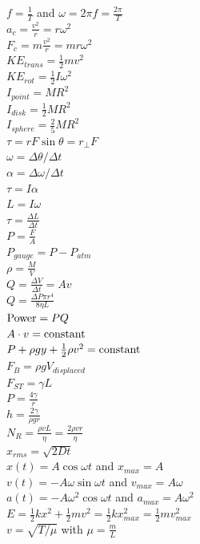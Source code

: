 \documentclass[letterpaper,addpoints,answers]{exam}
\begin{document}
\begin{multicols}{2}
 $f = \frac{1}{T}$ and $\omega = 2 \pi f = \frac{2 \pi}{T}$ \\
 $a_c = \frac{v^2}{r} = r \omega^2$ \\
 $F_c = m\frac{v^2}{r} = m r \omega^2$ \\
 $KE_{trans} = \frac{1}{2} m v^2$ \\
 $KE_{rot} = \frac{1}{2} I \omega^2$ \\
 $I_{point} = M R^2$ \\
 $I_{disk} = \frac{1}{2} M R^2$ \\
 $I_{sphere} = \frac{2}{5} M R^2$ \\
 $\tau = r F \sin\theta = r_\perp F$ \\
 $\omega = \Delta \theta/\Delta t$ \\
 $\alpha = \Delta \omega/\Delta t$ \\
 $\tau = I \alpha$ \\
 $L = I \omega$ \\
 $\tau = \frac{\Delta L}{\Delta t}$ \\
 $P = \frac{F}{A}$ \\
 $P_{gauge} = P - P_{atm}$ \\
 $\rho = \frac{M}{V}$ \\
 $Q = \frac{\Delta V}{\Delta t} = A v$ \\
 $Q = \frac{\Delta P \pi r^4}{8 \eta L}$ \\
 $\hbox{Power} = P Q$ \\
 $A \cdot v = \hbox{constant}$ \\
 $P + \rho g y + \frac{1}{2} \rho v^2 = \hbox{constant}$ \\
 $F_B = \rho g V_{displaced}$ \\
 $F_{ST} = \gamma L$ \\
 $P = \frac{4 \gamma}{r}$ \\
 $h = \frac{2 \gamma}{\rho g r}$ \\
 $N_R = \frac{\rho v L}{\eta} = \frac{2 \rho v r}{\eta}$ \\
 $x_{rms} = \sqrt{2 D t}$ \\
 $x(t) = A \cos \omega t$ and $x_{max} = A$ \\
 $v(t) = - A \omega \sin \omega t$ and $v_{max} = A \omega$ \\
 $a(t) = - A \omega^2 \cos \omega t$ and $a_{max} = A \omega^2$ \\
 $E = \frac{1}{2} k x^2 + \frac{1}{2} m v^2 = \frac{1}{2} k x_{max}^2 = \frac{1}{2} m v_{max}^2$ \\
 $v = \sqrt{T/\mu}$ with $\mu = \frac{m}{L}$ \\

\end{multicols}
\end{document}
